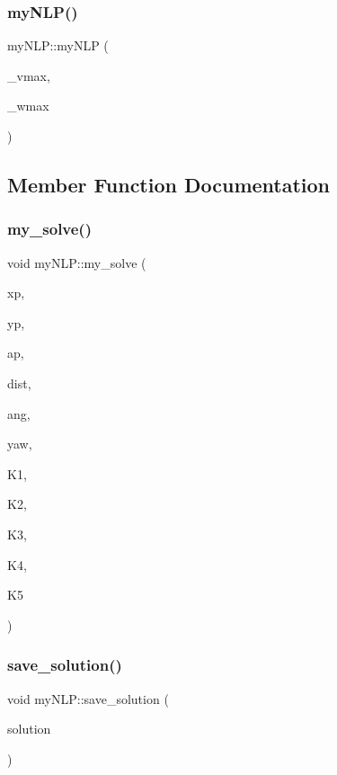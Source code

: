\subsubsection{\texorpdfstring{my\+N\+L\+P()}{myNLP()}}
{\footnotesize\ttfamily my\+N\+L\+P\+::my\+N\+LP (\begin{DoxyParamCaption}\item[{double}]{\+\_\+vmax,  }\item[{double}]{\+\_\+wmax }\end{DoxyParamCaption})}



\subsection{Member Function Documentation}
\mbox{\label{classmyNLP_ad8eba55aefb5ece257f2c6959aef3f91}} 
\subsubsection{\texorpdfstring{my\+\_\+solve()}{my\_solve()}}
{\footnotesize\ttfamily void my\+N\+L\+P\+::my\+\_\+solve (\begin{DoxyParamCaption}\item[{double}]{xp,  }\item[{double}]{yp,  }\item[{double}]{ap,  }\item[{double}]{dist,  }\item[{double}]{ang,  }\item[{double}]{yaw,  }\item[{double}]{K1,  }\item[{double}]{K2,  }\item[{double}]{K3,  }\item[{double}]{K4,  }\item[{double}]{K5 }\end{DoxyParamCaption})}

\mbox{\label{classmyNLP_a71acace73426061aef73e43f31396efa}} 
\subsubsection{\texorpdfstring{save\+\_\+solution()}{save\_solution()}}
{\footnotesize\ttfamily void my\+N\+L\+P\+::save\+\_\+solution (\begin{DoxyParamCaption}\item[{Cpp\+A\+D\+::ipopt\+::solve\+\_\+result$<$ Dvector $>$}]{solution }\end{DoxyParamCaption})}




